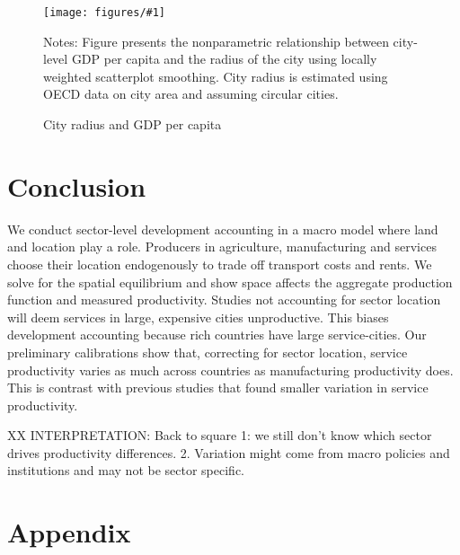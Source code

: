\documentclass[12pt]{article}
\newcommand{\dofigure}[3]{\begin{figure}
\begin{centering}
\texttt{[image: figures/\#1]}
  \caption{#2\label{fig:#1}}
\end{centering}

\noindent \footnotesize{#3}
\end{figure}}
\begin{document}
\dofigure{city_level_inputs/city_radius}{City radius and GDP per capita}{Notes: Figure presents the nonparametric relationship between city-level GDP per capita and the radius of the city using locally weighted scatterplot smoothing. City radius is estimated using OECD data on city area and assuming circular cities.}


\section{Conclusion}
We conduct sector-level development accounting in a macro model where land and location play a role. Producers in agriculture, manufacturing and services choose their location endogenously to trade off transport costs and rents. We solve for the spatial equilibrium and show space affects the aggregate production function and measured productivity. Studies not accounting for sector location will deem services in large, expensive cities unproductive. This biases development accounting because rich countries have large service-cities. Our preliminary calibrations show that, correcting for sector location, service productivity varies as much across countries as manufacturing productivity does. This is contrast with previous studies that found smaller variation in service productivity.

XX INTERPRETATION: Back to square 1: we still don’t know which sector drives productivity differences.
2. Variation might come from macro policies and institutions and may not be sector specific.

\clearpage





\clearpage

\section{Appendix}
\end{document}
